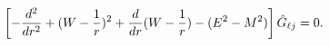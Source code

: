 \begin{equation}
\left[-{d^2\over dr^2}+(W-{1\over r})^2+\frac{d}{dr}(W-{1\over r})
-(E^2-M^2)\right]\hat G_{\ell j}=0.
\end{equation}

